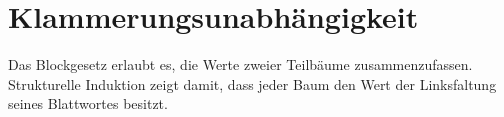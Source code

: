 \section{Klammerungsunabhängigkeit}

Das Blockgesetz erlaubt es, die Werte zweier Teilbäume zusammenzufassen.
Strukturelle Induktion zeigt damit, dass jeder Baum den Wert der
Linksfaltung seines Blattwortes besitzt.

\hypertarget{bracketing.statement.SemigroupTreeNormalFormLeaf}{}
\BracketingTreeNormalFormLeaf
\begin{tabproofwide}
\end{tabproofwide}

